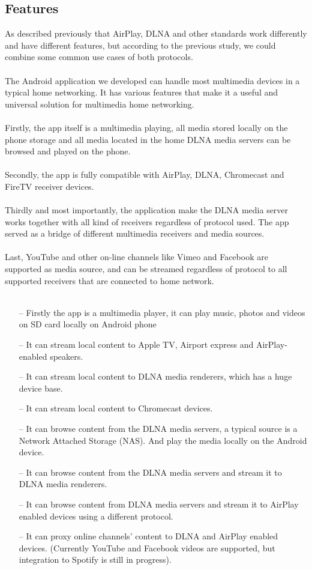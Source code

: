 \subsection{Features}
As described previously that AirPlay, DLNA and other standards work
differently and have different features, but according to the previous study,
we could combine some common use cases of both protocols.\\
\\
The Android application we developed can handle most multimedia devices in 
a typical home networking. It has various features that make it a useful and
universal solution for multimedia home networking.\\
\\
Firstly, the app itself is a multimedia playing, all media stored locally on the
phone storage and all media located in the home DLNA media servers can be
browsed and played on the phone.\\
\\
Secondly, the app is fully compatible with AirPlay, DLNA, Chromecast and FireTV
receiver devices.\\
\\ 
Thirdly and most importantly, the application make the DLNA media server works
together with all kind of receivers regardless of protocol used. The app served
as a bridge of different multimedia receivers and media sources.\\
\\
Last, YouTube and other on-line channels like Vimeo and Facebook are supported
as media source, and can be streamed regardless of protocol to all supported
receivers that are connected to home network.\\
\\
\begin{itemize}
\item[--]Firstly the app is a multimedia player, it can play music, photos and videos 
on SD card locally on Android phone
\item[--]It can stream local content to Apple TV, Airport express and AirPlay-enabled 
speakers.
\item[--]It can stream local content to DLNA media renderers, which has a huge device 
base.
\item[--]It can stream local content to Chromecast devices.
\item[--]It can browse content from the DLNA media servers, a typical source is a 
Network Attached Storage (NAS). And play the media locally on the Android device.
\item[--]It can browse content from the DLNA media servers and stream it to DLNA media 
renderers.
\item[--]It can browse content from DLNA media servers and stream it to AirPlay enabled 
devices using a different protocol.
\item[--]It can proxy online channels' content to DLNA and AirPlay enabled devices. 
(Currently YouTube and Facebook videos are supported, but integration to Spotify is still 
in progress).
\end{itemize}

